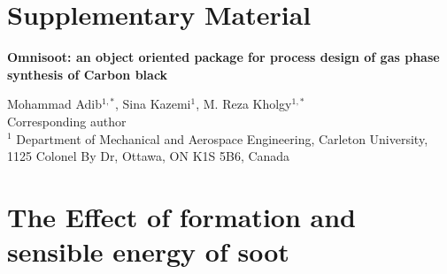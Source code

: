 \section*{Supplementary Material}

\begin{center}
	\vspace*{1cm} %
	\textbf{\LARGE 		Omnisoot: an object oriented package for process design of gas phase synthesis of Carbon black} 
\end{center}

\begin{center}
	Mohammad Adib$^{1,*}$, Sina Kazemi$^1$, M. Reza Kholgy$^{1,*}$ \\
	{\small *Corresponding author} \\
	$^1$ Department of Mechanical and Aerospace Engineering, Carleton University, 1125 Colonel By Dr, Ottawa, ON K1S 5B6, Canada
\end{center}

\beginsupplement


\section{The Effect of formation and sensible energy of soot}

